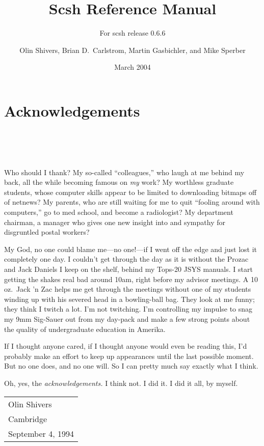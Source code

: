 
\title{Scsh Reference Manual}
\subtitle{For scsh release 0.6.6}
\author{Olin Shivers, Brian D.~Carlstrom, Martin Gasbichler, and Mike Sperber}
\date{March 2004}

\maketitle
\texonly
\chapter*{Acknowledgements}
\endtexonly
\htmlonly
\\  \\ \\
\endhtmlonly

Who should I thank?
My so-called ``colleagues,'' who laugh at me behind my back,
    all the while becoming famous on {\em my\/} work?
My worthless graduate students, whose computer skills appear to
    be limited to downloading bitmaps off of netnews?
My parents, who are still waiting for me to quit ``fooling around with
    computers,'' go to med school, and become a radiologist?
My department chairman, a manager who gives one new insight into
    and sympathy for disgruntled postal workers?

My God, no one could blame me---no one!---if I went off the edge and just
    lost it completely one day.
I couldn't get through the day as it is without the Prozac and Jack Daniels
    I keep on the shelf, behind my Tops-20 JSYS manuals.
    I start getting the shakes real bad around 10am, right before my
    advisor meetings. A 10 oz.\ Jack 'n Zac helps me get through the
    meetings without one of my students winding up with his severed head
    in a bowling-ball bag. They look at me funny; they think I twitch a
    lot. I'm not twitching. I'm controlling my impulse to snag my 9mm
    Sig-Sauer out from my day-pack and make a few strong points about
    the quality of undergraduate education in Amerika.

If I thought anyone cared, if I thought anyone would even be reading this,
I'd probably make an effort to keep up appearances until the last possible
moment. But no one does, and no one will. So I can pretty much say exactly
what I think.

Oh, yes, the {\em acknowledgements.}
I think not. I did it. I did it all, by myself.
\begin{flushright}
\begin{tabular}{l}
Olin Shivers    \\
Cambridge       \\
September 4, 1994
\end{tabular}
\end{flushright}

\tableofcontents
